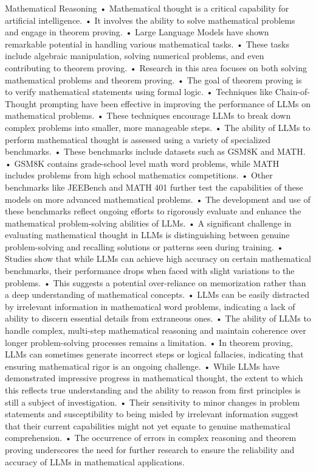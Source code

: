 \begin{frame}{Mathematical Reasoning}
	•	Mathematical thought is a critical capability for artificial intelligence.
	•	It involves the ability to solve mathematical problems and engage in theorem proving.
	•	Large Language Models have shown remarkable potential in handling various mathematical tasks.
	•	These tasks include algebraic manipulation, solving numerical problems, and even contributing to theorem proving.
	•	Research in this area focuses on both solving mathematical problems and theorem proving.
	•	The goal of theorem proving is to verify mathematical statements using formal logic.
	•	Techniques like Chain-of-Thought prompting have been effective in improving the performance of LLMs on mathematical problems.
	•	These techniques encourage LLMs to break down complex problems into smaller, more manageable steps.
	•	The ability of LLMs to perform mathematical thought is assessed using a variety of specialized benchmarks.
	•	These benchmarks include datasets such as GSM8K and MATH.
	•	GSM8K contains grade-school level math word problems, while MATH includes problems from high school mathematics competitions.
	•	Other benchmarks like JEEBench and MATH 401 further test the capabilities of these models on more advanced mathematical problems.
	•	The development and use of these benchmarks reflect ongoing efforts to rigorously evaluate and enhance the mathematical problem-solving abilities of LLMs.
	•	A significant challenge in evaluating mathematical thought in LLMs is distinguishing between genuine problem-solving and recalling solutions or patterns seen during training.
	•	Studies show that while LLMs can achieve high accuracy on certain mathematical benchmarks, their performance drops when faced with slight variations to the problems.
	•	This suggests a potential over-reliance on memorization rather than a deep understanding of mathematical concepts.
	•	LLMs can be easily distracted by irrelevant information in mathematical word problems, indicating a lack of ability to discern essential details from extraneous ones.
	•	The ability of LLMs to handle complex, multi-step mathematical reasoning and maintain coherence over longer problem-solving processes remains a limitation.
	•	In theorem proving, LLMs can sometimes generate incorrect steps or logical fallacies, indicating that ensuring mathematical rigor is an ongoing challenge.
	•	While LLMs have demonstrated impressive progress in mathematical thought, the extent to which this reflects true understanding and the ability to reason from first principles is still a subject of investigation.
	•	Their sensitivity to minor changes in problem statements and susceptibility to being misled by irrelevant information suggest that their current capabilities might not yet equate to genuine mathematical comprehension.
	•	The occurrence of errors in complex reasoning and theorem proving underscores the need for further research to ensure the reliability and accuracy of LLMs in mathematical applications.

\end{frame}

